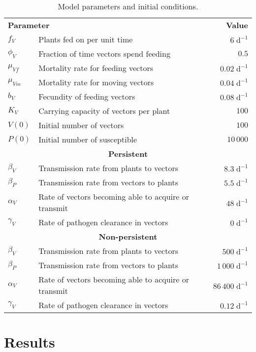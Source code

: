 \documentclass{article}
\begin{document}
\begin{table}
  \centering
  \begin{tabular}{llr}
    \multicolumn{2}{l}{\textbf{Parameter}}
    & \multicolumn{1}{r}{\textbf{Value}}
    \\
    $f_V$ & Plants fed on per unit time & $6\;\text{d}^{-1}$
    \\
    $\phi_V$ & Fraction of time vectors spend feeding & $0.5$
    \\
    $\mu_{Vf}$ & Mortality rate for feeding vectors & $0.02\;\text{d}^{-1}$
    \\
    $\mu_{Vm}$ & Mortality rate for moving vectors & $0.04\;\text{d}^{-1}$
    \\
    $b_V$ & Fecundity of feeding vectors & $0.08\;\text{d}^{-1}$
    \\
    $K_V$ & Carrying capacity of vectors per plant & $100$
    \\
    $V(0)$ & Initial number of vectors & $100$
    \\
    $P(0)$ & Initial number of susceptible & $10\,000$
    \\
    \multicolumn{3}{c}{\textbf{Persistent}}
    \\
    $\beta_V$ & Transmission rate from plants to vectors & $8.3\;\text{d}^{-1}$
    \\
    $\beta_P$ & Transmission rate from vectors to plants & $5.5\;\text{d}^{-1}$
    \\
    $\alpha_V$ & Rate of vectors becoming able to acquire or transmit & $48\;\text{d}^{-1}$
    \\
    $\gamma_V$ & Rate of pathogen clearance in vectors & $0\;\text{d}^{-1}$
    \\
    \multicolumn{3}{c}{\textbf{Non-persistent}}
    \\
    $\beta_V$ & Transmission rate from plants to vectors & $500\;\text{d}^{-1}$
    \\
    $\beta_P$ & Transmission rate from vectors to plants & $1\,000\;\text{d}^{-1}$
    \\
    $\alpha_V$ & Rate of vectors becoming able to acquire or transmit & $86\,400\;\text{d}^{-1}$
    \\
    $\gamma_V$ & Rate of pathogen clearance in vectors & $0.12\;\text{d}^{-1}$
  \end{tabular}
  \caption{Model parameters and initial conditions.}
  \label{params}
\end{table}


\section{Results}
\end{document}
